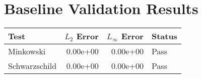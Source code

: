 \documentclass{article}
\begin{document}
\section*{Baseline Validation Results}
\begin{tabular}{lrrl}
\toprule
Test           & $L_2$ Error & $L_\infty$ Error & Status \\
\midrule
Minkowski & 0.00e+00 & 0.00e+00 & Pass \\
Schwarzschild & 0.00e+00 & 0.00e+00 & Pass \\
\bottomrule
\end{tabular}
\end{document}
